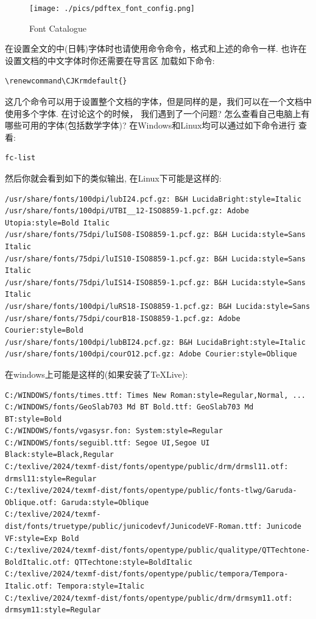 \begin{figure}[!htb]
    \centering
    \texttt{[image: ./pics/pdftex\_font\_config.png]}
    \caption{Font Catalogue}
    \label{fig:FontCatalogue}
\end{figure}


\begin{remark}
在设置全文的中(日韩)字体时也请使用命令\cmd{\setCJKmainfont}命令，格式和上述的命令一样. 也许在设置文档的中文字体时你还需要在导言区
加载如下命令:
\end{remark}
\begin{verbatim}
\renewcommand\CJKrmdefault{}
\end{verbatim}

这几个命令可以用于设置整个文档的字体，但是同样的是，我们可以在一个文档中使用多个字体. 在讨论这个的时候，
我们遇到了一个问题? 怎么查看自己电脑上有哪些可用的字体(包括数学字体)? 在Windows和Linux均可以通过如下命令进行
查看:
\begin{verbatim}
fc-list 
\end{verbatim}

然后你就会看到如下的类似输出, 在Linux下可能是这样的:
\begin{verbatim}
/usr/share/fonts/100dpi/lubI24.pcf.gz: B&H LucidaBright:style=Italic
/usr/share/fonts/100dpi/UTBI__12-ISO8859-1.pcf.gz: Adobe Utopia:style=Bold Italic
/usr/share/fonts/75dpi/luIS08-ISO8859-1.pcf.gz: B&H Lucida:style=Sans Italic
/usr/share/fonts/75dpi/luIS10-ISO8859-1.pcf.gz: B&H Lucida:style=Sans Italic
/usr/share/fonts/75dpi/luIS14-ISO8859-1.pcf.gz: B&H Lucida:style=Sans Italic
/usr/share/fonts/100dpi/luRS18-ISO8859-1.pcf.gz: B&H Lucida:style=Sans
/usr/share/fonts/75dpi/courB18-ISO8859-1.pcf.gz: Adobe Courier:style=Bold
/usr/share/fonts/100dpi/lubBI24.pcf.gz: B&H LucidaBright:style=Italic
/usr/share/fonts/100dpi/courO12.pcf.gz: Adobe Courier:style=Oblique
\end{verbatim}

在windows上可能是这样的(如果安装了\TeX{}Live):
\begin{verbatim}
C:/WINDOWS/fonts/times.ttf: Times New Roman:style=Regular,Normal, ...
C:/WINDOWS/fonts/GeoSlab703 Md BT Bold.ttf: GeoSlab703 Md BT:style=Bold
C:/WINDOWS/fonts/vgasysr.fon: System:style=Regular
C:/WINDOWS/fonts/seguibl.ttf: Segoe UI,Segoe UI Black:style=Black,Regular
C:/texlive/2024/texmf-dist/fonts/opentype/public/drm/drmsl11.otf: drmsl11:style=Regular
C:/texlive/2024/texmf-dist/fonts/opentype/public/fonts-tlwg/Garuda-Oblique.otf: Garuda:style=Oblique
C:/texlive/2024/texmf-dist/fonts/truetype/public/junicodevf/JunicodeVF-Roman.ttf: Junicode VF:style=Exp Bold
C:/texlive/2024/texmf-dist/fonts/opentype/public/qualitype/QTTechtone-BoldItalic.otf: QTTechtone:style=BoldItalic
C:/texlive/2024/texmf-dist/fonts/opentype/public/tempora/Tempora-Italic.otf: Tempora:style=Italic
C:/texlive/2024/texmf-dist/fonts/opentype/public/drm/drmsym11.otf: drmsym11:style=Regular
\end{verbatim}

